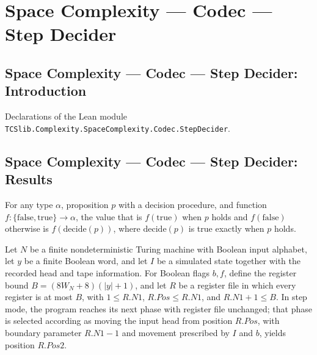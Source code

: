 \section{Space Complexity --- Codec --- Step Decider}
\subsection*{Space Complexity --- Codec --- Step Decider: Introduction}

Declarations of the Lean module \texttt{TCSlib.Complexity.SpaceComplexity.Codec.StepDecider}.

\subsection*{Space Complexity --- Codec --- Step Decider: Results}

\begin{lemma}
\label{Complexity.Codec.ite_bool}
\leanok
{}
For any type $\alpha$, proposition $p$ with a decision procedure, and function
$f:\{\mathrm{false},\mathrm{true}\}\to\alpha$, the value that is $f(\mathrm{true})$ when
$p$ holds and $f(\mathrm{false})$ otherwise is $f(\mathrm{decide}(p))$, where
$\mathrm{decide}(p)$ is true exactly when $p$ holds.
\end{lemma}

\begin{theorem}
\label{Complexity.Codec.pm_run}
\leanok
{}
Let $N$ be a finite nondeterministic Turing machine with Boolean input alphabet, let $y$
be a finite Boolean word, and let $I$ be a simulated state together with the recorded
head and tape information. For Boolean flags $b,f$, define the register bound
$B=(8W_N+8)(|y|+1)$, and let $R$ be a register file in which every register is at most
$B$, with $1\le R.N1$, $R.Pos\le R.N1$, and $R.N1+1\le B$. In step mode, the program
reaches its next phase with register file unchanged; that phase is selected according as
moving the input head from position $R.Pos$, with boundary parameter $R.N1-1$ and
movement prescribed by $I$ and $b$, yields position $R.Pos2$.
\end{theorem}

